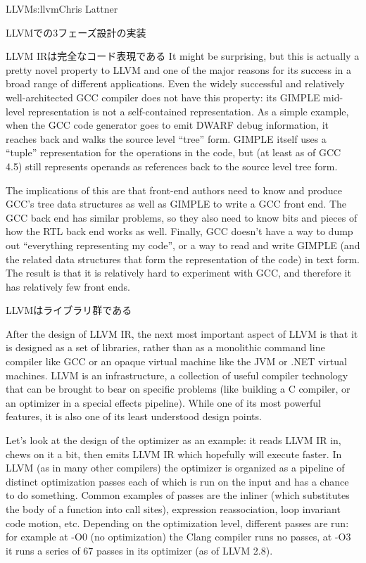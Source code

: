 \begin{aosachapter}{LLVM}{s:llvm}{Chris Lattner}
\begin{aosasect1}{LLVMでの3フェーズ設計の実装}
\begin{aosasect2}{LLVM IRは完全なコード表現である}
It might be surprising, but this is actually a pretty novel property
to LLVM and one of the major reasons for its success in a broad range
of different applications.  Even the widely successful and relatively
well-architected GCC compiler does not have this property: its GIMPLE
mid-level representation is not a self-contained representation.  As a
simple example, when the GCC code generator goes to emit DWARF debug
information, it reaches back and walks the source level ``tree'' form.
GIMPLE itself uses a ``tuple'' representation for the operations in
the code, but (at least as of GCC 4.5) still represents operands as
references back to the source level tree form.

The implications of this are that front-end authors need to know and
produce GCC's tree data structures as well as GIMPLE to write a GCC
front end.  The GCC back end has similar problems, so they also need to
know bits and pieces of how the RTL back end works as well.  Finally,
GCC doesn't have a way to dump out ``everything representing my
code'', or a way to read and write GIMPLE (and the related data
structures that form the representation of the code) in text form.
The result is that it is relatively hard to experiment with GCC, and
therefore it has relatively few front ends.

\end{aosasect2}

\begin{aosasect2}{LLVMはライブラリ群である}

After the design of LLVM IR, the next most important
aspect of LLVM is that it is designed as a set of libraries, rather than as a
monolithic command line compiler like GCC or an opaque virtual machine
like the JVM or .NET virtual machines.  LLVM is an
infrastructure, a collection of useful compiler technology that can be
brought to bear on specific problems (like building a C compiler, or
an optimizer in a special effects pipeline).  While one of its most
powerful features, it is also one of its least understood design
points.

Let's look at the design of the optimizer as an example: it reads LLVM
IR in, chews on it a bit, then emits LLVM IR which hopefully will
execute faster.  In LLVM (as in many other compilers) the optimizer is
organized as a pipeline of distinct optimization passes each of which
is run on the input and has a chance to do something.  Common examples
of passes are the inliner (which substitutes the body of a function
into call sites), expression reassociation, loop invariant code
motion, etc.  Depending on the optimization level, different passes
are run: for example at -O0 (no optimization) the Clang compiler runs
no passes, at -O3 it runs a series of 67 passes in its optimizer (as
of LLVM 2.8).


\end{aosasect2}
\end{aosasect1}
\end{aosachapter}
